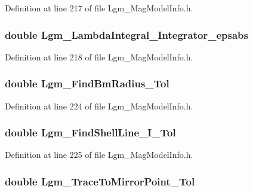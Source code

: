 Definition at line 217 of file Lgm\_\-MagModelInfo.h.\hypertarget{struct_lgm___mag_model_info_84e45c331b0974d7470a7c5796550069}{
\subsubsection[{Lgm\_\-LambdaIntegral\_\-Integrator\_\-epsabs}]{\setlength{\rightskip}{0pt plus 5cm}double {\bf Lgm\_\-LambdaIntegral\_\-Integrator\_\-epsabs}}}
\label{struct_lgm___mag_model_info_84e45c331b0974d7470a7c5796550069}




Definition at line 218 of file Lgm\_\-MagModelInfo.h.\hypertarget{struct_lgm___mag_model_info_87d9547dc23285cacd4e7eb0a4fa81c8}{
\subsubsection[{Lgm\_\-FindBmRadius\_\-Tol}]{\setlength{\rightskip}{0pt plus 5cm}double {\bf Lgm\_\-FindBmRadius\_\-Tol}}}
\label{struct_lgm___mag_model_info_87d9547dc23285cacd4e7eb0a4fa81c8}




Definition at line 224 of file Lgm\_\-MagModelInfo.h.\hypertarget{struct_lgm___mag_model_info_aa3a6471b016a88d0c199e4689b5115b}{
\subsubsection[{Lgm\_\-FindShellLine\_\-I\_\-Tol}]{\setlength{\rightskip}{0pt plus 5cm}double {\bf Lgm\_\-FindShellLine\_\-I\_\-Tol}}}
\label{struct_lgm___mag_model_info_aa3a6471b016a88d0c199e4689b5115b}




Definition at line 225 of file Lgm\_\-MagModelInfo.h.\hypertarget{struct_lgm___mag_model_info_371678dd73a628d7a7e92195a977f2ab}{
\subsubsection[{Lgm\_\-TraceToMirrorPoint\_\-Tol}]{\setlength{\rightskip}{0pt plus 5cm}double {\bf Lgm\_\-TraceToMirrorPoint\_\-Tol}}}
\label{struct_lgm___mag_model_info_371678dd73a628d7a7e92195a977f2ab}




